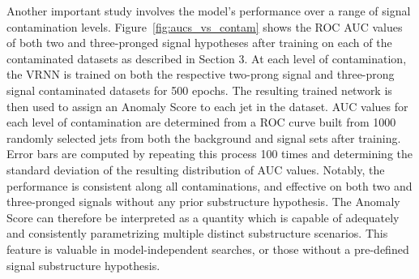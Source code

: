 \documentclass[12pt, a4paper]{article}
\begin{document}



Another important study involves the model's performance over a range of signal contamination
levels. Figure~\ref{fig:aucs_vs_contam} shows the ROC AUC values of both two and three-pronged signal hypotheses
after training on each of the contaminated datasets as described in Section 3. 
At each level of contamination, the VRNN is trained on both the respective two-prong signal and three-prong signal contaminated datasets for 500 epochs. 
The resulting trained network is then used to assign an Anomaly Score to each jet in the dataset. 
AUC values for each level of contamination are determined from a ROC curve built from 1000 randomly selected jets from both the background and signal sets after training.
Error bars are computed by repeating this process 100 times and determining the standard deviation of the resulting distribution of AUC values.
Notably, the performance is consistent along all contaminations, and effective on both two and three-pronged signals without any prior substructure hypothesis. 
The Anomaly Score can therefore be interpreted as a quantity which is capable of adequately and consistently parametrizing multiple distinct substructure scenarios. 
This feature is valuable in model-independent searches, or those without a pre-defined signal substructure hypothesis. 
\end{document}
